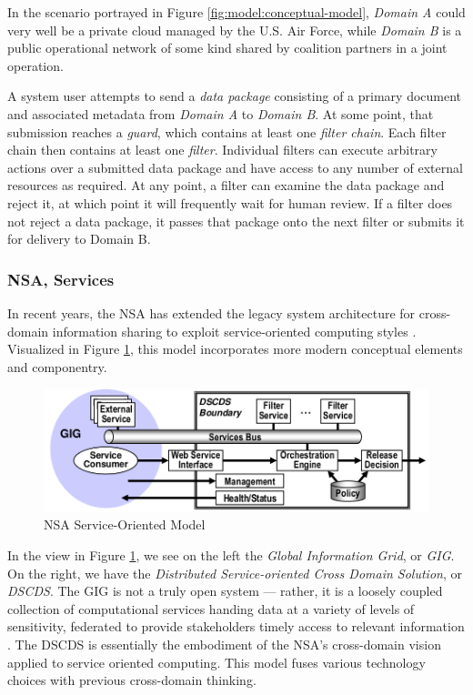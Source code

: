 \documentclass[12pt,letterpaper]{article}
\begin{document}
In the scenario portrayed in Figure \ref{fig:model:conceptual-model}, \textit{Domain A} could very well be a private cloud managed by the U.S. Air Force, while \textit{Domain B} is a public operational network of some kind shared by coalition partners in a joint operation.

A system user attempts to send a \textit{data package} consisting of a primary document and associated metadata from \textit{Domain A} to \textit{Domain B}.  At some point, that submission reaches a \textit{guard}, which contains at least one \textit{filter chain}.  Each filter chain then contains at least one \textit{filter}.  Individual filters can execute arbitrary actions over a submitted data package and have access to any number of external resources as required.  At any point, a filter can examine the data package and reject it, at which point it will frequently wait for human review.  If a filter does not reject a data package, it passes that package onto the next filter or submits it for delivery to Domain B.

\subsubsection{NSA, Services}
In recent years, the NSA has extended the legacy system architecture for cross-domain information sharing to exploit service-oriented computing styles \cite{proposal:nsa-arch}.  Visualized in Figure \ref{fig:model:conceptual-model-services}, this model incorporates more modern conceptual elements and componentry.

\begin{figure}[!t]
\centering
\includegraphics[width=5in]{nsa-arch}
\caption{NSA Service-Oriented Model}
\label{fig:model:conceptual-model-services}
\end{figure}

In the view in Figure \ref{fig:model:conceptual-model-services}, we see on the left the \textit{Global Information Grid}, or \textit{GIG}.  On the right, we have the \textit{Distributed Service-oriented Cross Domain Solution}, or \textit{DSCDS}.  The GIG is not a truly open system --- rather, it is a loosely coupled collection of computational services handing data at a variety of levels of sensitivity, federated to provide stakeholders timely access to relevant information \cite{proposal:gig-arch}.  The DSCDS is essentially the embodiment of the NSA's cross-domain vision applied to service oriented computing.  This model fuses various technology choices with previous cross-domain thinking.
\end{document}
